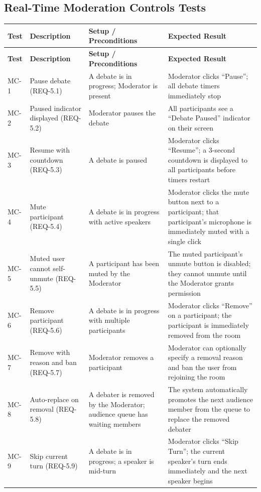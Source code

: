 \documentclass[12pt]{article}
\begin{document}
\subsection{Real-Time Moderation Controls Tests}

\begin{longtable}{|p{1.5cm}|p{3cm}|p{4cm}|p{4cm}|}
\hline
\textbf{Test} & \textbf{Description} & \textbf{Setup / Preconditions} & \textbf{Expected Result} \\
\hline
\endfirsthead
\hline
\textbf{Test} & \textbf{Description} & \textbf{Setup / Preconditions} & \textbf{Expected Result} \\
\hline
\endhead
MC-1 & Pause debate (REQ-5.1) & A debate is in progress; Moderator is present & Moderator clicks ``Pause''; all debate timers immediately stop \\
\hline
MC-2 & Paused indicator displayed (REQ-5.2) & Moderator pauses the debate & All participants see a ``Debate Paused'' indicator on their screen \\
\hline
MC-3 & Resume with countdown (REQ-5.3) & A debate is paused & Moderator clicks ``Resume''; a 3-second countdown is displayed to all participants before timers restart \\
\hline
MC-4 & Mute participant (REQ-5.4) & A debate is in progress with active speakers & Moderator clicks the mute button next to a participant; that participant's microphone is immediately muted with a single click \\
\hline
MC-5 & Muted user cannot self-unmute (REQ-5.5) & A participant has been muted by the Moderator & The muted participant's unmute button is disabled; they cannot unmute until the Moderator grants permission \\
\hline
MC-6 & Remove participant (REQ-5.6) & A debate is in progress with multiple participants & Moderator clicks ``Remove'' on a participant; the participant is immediately removed from the room \\
\hline
MC-7 & Remove with reason and ban (REQ-5.7) & Moderator removes a participant & Moderator can optionally specify a removal reason and ban the user from rejoining the room \\
\hline
MC-8 & Auto-replace on removal (REQ-5.8) & A debater is removed by the Moderator; audience queue has waiting members & The system automatically promotes the next audience member from the queue to replace the removed debater \\
\hline
MC-9 & Skip current turn (REQ-5.9) & A debate is in progress; a speaker is mid-turn & Moderator clicks ``Skip Turn''; the current speaker's turn ends immediately and the next speaker begins \\

\end{longtable}
\end{document}
